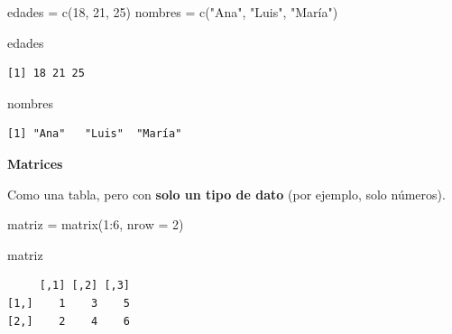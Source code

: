 \documentclass[
  letterpaper,
  DIV=11,
  numbers=noendperiod,
  twoside]{scrreprt}
\newenvironment{Shaded}{\begin{snugshade}}{\end{snugshade}}
\newcommand{\AttributeTok}[1]{\textcolor[rgb]{0.40,0.45,0.13}{#1}}
\newcommand{\DecValTok}[1]{\textcolor[rgb]{0.68,0.00,0.00}{#1}}
\newcommand{\FunctionTok}[1]{\textcolor[rgb]{0.28,0.35,0.67}{#1}}
\newcommand{\NormalTok}[1]{\textcolor[rgb]{0.00,0.23,0.31}{#1}}
\newcommand{\OtherTok}[1]{\textcolor[rgb]{0.00,0.23,0.31}{#1}}
\newcommand{\SpecialCharTok}[1]{\textcolor[rgb]{0.37,0.37,0.37}{#1}}
\newcommand{\StringTok}[1]{\textcolor[rgb]{0.13,0.47,0.30}{#1}}
\begin{document}
\begin{Shaded}
\begin{Highlighting}[]
\NormalTok{edades }\OtherTok{=} \FunctionTok{c}\NormalTok{(}\DecValTok{18}\NormalTok{, }\DecValTok{21}\NormalTok{, }\DecValTok{25}\NormalTok{)}
\NormalTok{nombres }\OtherTok{=} \FunctionTok{c}\NormalTok{(}\StringTok{"Ana"}\NormalTok{, }\StringTok{"Luis"}\NormalTok{, }\StringTok{"María"}\NormalTok{)}
\end{Highlighting}
\end{Shaded}

\begin{Shaded}
\begin{Highlighting}[]
\NormalTok{edades}
\end{Highlighting}
\end{Shaded}

\begin{verbatim}
[1] 18 21 25
\end{verbatim}

\begin{Shaded}
\begin{Highlighting}[]
\NormalTok{nombres}
\end{Highlighting}
\end{Shaded}

\begin{verbatim}
[1] "Ana"   "Luis"  "María"
\end{verbatim}

\textbf{Matrices}

Como una tabla, pero con \textbf{solo un tipo de dato} (por ejemplo,
solo números).

\begin{Shaded}
\begin{Highlighting}[]
\NormalTok{matriz }\OtherTok{=} \FunctionTok{matrix}\NormalTok{(}\DecValTok{1}\SpecialCharTok{:}\DecValTok{6}\NormalTok{, }\AttributeTok{nrow =} \DecValTok{2}\NormalTok{)}
\end{Highlighting}
\end{Shaded}

\begin{Shaded}
\begin{Highlighting}[]
\NormalTok{matriz}
\end{Highlighting}
\end{Shaded}

\begin{verbatim}
     [,1] [,2] [,3]
[1,]    1    3    5
[2,]    2    4    6
\end{verbatim}
\end{document}
